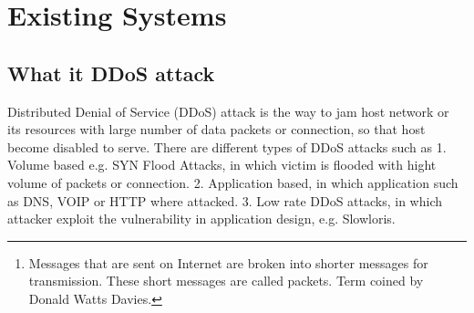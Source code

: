 \documentclass[12pt,oneside,a4paper]{article}
\begin{document}

\doublespacing
\renewcommand{\thepage}{\roman{page}}%
\setcounter{page}{2}%
\tableofcontents
\newpage
\pagestyle{myheadings}
\renewcommand{\thepage}{\arabic{page}}%

\begin{abstract}
Distributed Denial of Service (DDoS) attacks are very common these days\cite{ddos-attack-news}. So it is evident that current industry solutions such as completely relying on Internet Service Provider(ISP) or setting up DDoS defense infrastructure are not sufficient in detecting and mitigating DDoS attacks, hence consistent research is needed. Most of the current industry solutions involve setting up centralized expensive hardware system which can analyze the packets\footnote{Messages that are sent on Internet are broken into shorter messages for transmission. These short messages are called packets. Term coined by Donald Watts Davies.} \cite{network-data-packet} for probable DDoS attacks. Also each router provider has different protocols to communicate the between the DDoS attack detection system and the router limiting the reach of DDoS detection systems. In this paper we are going to discuss a way to detect DDoS attack using machine learning tools at the routers, also we will propose a communication architecture for mitigating it.
\end{abstract}

\section{Existing Systems}

\subsection{What it DDoS attack}
Distributed Denial of Service (DDoS) attack is the way to jam host network or its resources with large number of data packets or connection, so that host become disabled to serve. There are different types of DDoS attacks such as
1. Volume based e.g. SYN Flood Attacks, in which victim is flooded with hight volume of packets or connection.
2. Application based, in which application such as DNS, VOIP or HTTP where attacked.
3. Low rate DDoS attacks, in which attacker exploit the vulnerability in application design, e.g. Slowloris.
\cite{DDoS-attacks}
\end{document}
